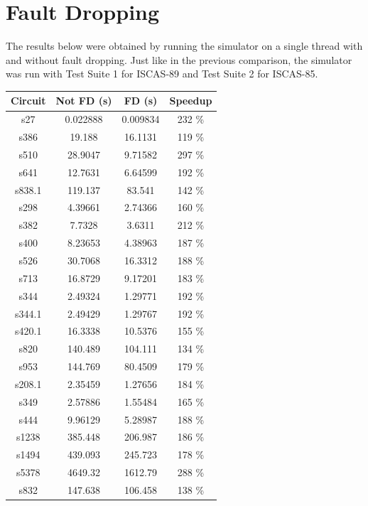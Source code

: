 \documentclass[a4paper,12pt]{article}
\begin{document}
\clearpage

\section*{Fault Dropping}

The results below were obtained by running the simulator on a single thread with and without fault dropping. Just like in the previous comparison, the simulator was run with Test Suite 1 for ISCAS-89 and Test Suite 2 for ISCAS-85. 


\begin{center}
\begin{tabular}{||c c c c||}
\hline
Circuit & Not FD (s) & FD (s) & Speedup \\ [0.5ex] 
\hline\hline
s27 & 0.022888 & 0.009834 & 232 \% \\ 
\hline
s386 & 19.188 & 16.1131 & 119 \% \\ 
\hline
s510 & 28.9047 & 9.71582 & 297 \% \\ 
\hline
s641 & 12.7631 & 6.64599 & 192 \% \\ 
\hline
s838.1 & 119.137 & 83.541 & 142 \% \\ 
\hline
s298 & 4.39661 & 2.74366 & 160 \% \\ 
\hline
s382 & 7.7328 & 3.6311 & 212 \% \\ 
\hline
s400 & 8.23653 & 4.38963 & 187 \% \\ 
\hline
s526 & 30.7068 & 16.3312 & 188 \% \\ 
\hline
s713 & 16.8729 & 9.17201 & 183 \% \\ 
\hline
s344 & 2.49324 & 1.29771 & 192 \% \\ 
\hline
s344.1 & 2.49429 & 1.29767 & 192 \% \\ 
\hline
s420.1 & 16.3338 & 10.5376 & 155 \% \\ 
\hline
s820 & 140.489 & 104.111 & 134 \% \\ 
\hline
s953 & 144.769 & 80.4509 & 179 \% \\ 
\hline
s208.1 & 2.35459 & 1.27656 & 184 \% \\ 
\hline
s349 & 2.57886 & 1.55484 & 165 \% \\ 
\hline
s444 & 9.96129 & 5.28987 & 188 \% \\ 
\hline
s1238 & 385.448 & 206.987 & 186 \% \\ 
\hline
s1494 & 439.093 & 245.723 & 178 \% \\ 
\hline
s5378 & 4649.32 & 1612.79 & 288 \% \\ 
\hline
s832 & 147.638 & 106.458 & 138 \% \\ 

\end{tabular}
\end{center}
\end{document}
